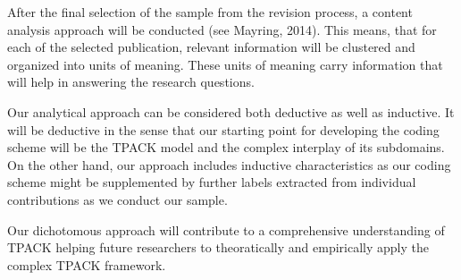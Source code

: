 \documentclass[
]{article}
\begin{document}
After the final selection of the sample from the revision process, a
content analysis approach will be conducted (see Mayring, 2014). This
means, that for each of the selected publication, relevant information
will be clustered and organized into units of meaning. These units of
meaning carry information that will help in answering the research
questions.

Our analytical approach can be considered both deductive as well as
inductive. It will be deductive in the sense that our starting point for
developing the coding scheme will be the TPACK model and the complex
interplay of its subdomains. On the other hand, our approach includes
inductive characteristics as our coding scheme might be supplemented by
further labels extracted from individual contributions as we conduct our
sample.

Our dichotomous approach will contribute to a comprehensive
understanding of TPACK helping future researchers to theoratically and
empirically apply the complex TPACK framework.
\end{document}
